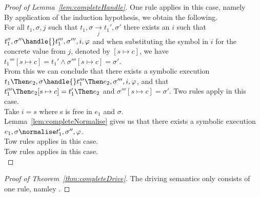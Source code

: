 \begin{proof}[Proof of Lemma~\ref{lem:completeHandle}]
  {
  One rule applies in this case, namely \\

  By application of the induction hypothesis, we obtain the following.\\
  For all $t_1,\sigma,j$ such that $t_1,\sigma\xrightarrow[j]{}t_1',\sigma'$ there exists an $i$ such that $t_1'',\sigma''\handle{}t_1''',\sigma''',i,\phi$ and when substituting the symbol in $i$ for the concrete value from $j$, denoted by $[s\mapsto c]$, we have $t_1'''[s\mapsto c] = t_1'\land \sigma'''[s\mapsto c]=\sigma'$.\\
  From this we can conclude that there exists a symbolic execution $t_1\Then e_2,\sigma\handle{} t_1'''\Then e_2,\sigma''',i,\phi$, and that $t_1'''\Then e_2[s\mapsto c] = t_1'\Then e_2$ and $\sigma'''[s\mapsto c]=\sigma'$.
  }
  {
  Two rules apply in this case.\\
    {
      Take $i=s$ where s is free in $e_1$ and $\sigma$.\\
      Lemma~\ref{lem:completeNormalise} gives us that there exists a symbolic execution $e_1,\sigma\normalise t_1',\sigma'',\phi$.\\
    }
    {
    }
  }
    {
    Tow rules applies in this case.\\
    }
    {
    Tow rules applies in this case.\\
    }

\end{proof}



\begin{proof}[Proof of Theorem~\ref{thm:completeDrive}]
  The driving semantics only consists of one rule, namley .
\end{proof}
